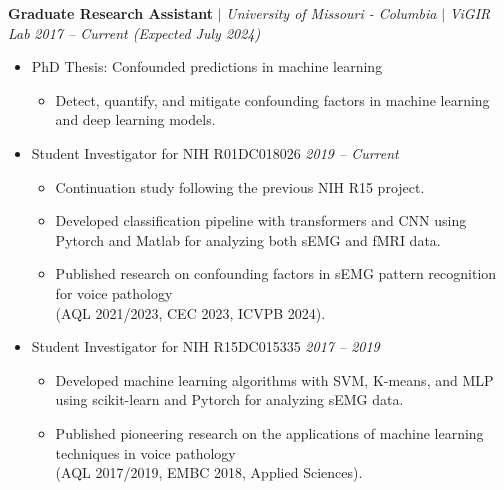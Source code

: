 \documentclass[letterpaper,10pt]{article}
\begin{document}
\textbf{Graduate Research Assistant} $|$
\emph{University of Missouri - Columbia} $|$
\emph{ViGIR Lab} \hfill
\emph{2017 -- Current (Expected July 2024)}
\begin{itemize}[leftmargin=0.15in, parsep=0pt] 
  \item PhD Thesis: Confounded predictions in machine learning
  \begin{itemize}[leftmargin=0.15in, parsep=0pt] 
    \item Detect, quantify, and mitigate confounding factors in machine learning and deep learning models.
  \end{itemize}
  \item Student Investigator for NIH R01DC018026 \hfill
  \emph{2019 -- Current}
  \begin{itemize}[leftmargin=0.15in, parsep=0pt]
    \item Continuation study following the previous NIH R15 project.
    \item Developed classification pipeline with transformers and CNN using Pytorch and Matlab for analyzing both sEMG and fMRI data. 
    \item Published research on confounding factors in sEMG pattern recognition for voice pathology\\ (AQL 2021/2023, CEC 2023, ICVPB 2024). 
  \end{itemize}
  \item Student Investigator for NIH R15DC015335 \hfill
  \emph{2017 -- 2019}
  \begin{itemize}[leftmargin=0.15in, parsep=0pt]
    \item Developed machine learning algorithms with SVM, K-means, and MLP using scikit-learn and Pytorch for analyzing sEMG data.
    \item Published pioneering research on the applications of machine learning techniques in voice pathology\\ (AQL 2017/2019, EMBC 2018, Applied Sciences).
  \end{itemize}
\end{itemize}
\end{document}
